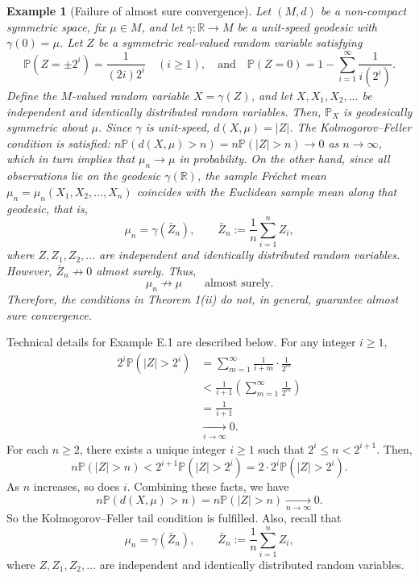 \documentclass[preprint]{imsart}
\theoremstyle{plain}
\newtheorem{example}{Example}
\theoremstyle{remark}
\begin{document}
\begin{appendix}
\begin{example}[Failure of almost sure convergence]
Let $(M, d)$ be a non-compact symmetric space, fix $\mu \in M$, and let $\gamma:\mathbb{R}\to M$ be a unit-speed geodesic with $\gamma(0)=\mu$. Let $Z$ be a symmetric real-valued random variable satisfying
$$
\mathbb{P}(Z = \pm 2^i) = \frac{1}{(2i)2^i} \quad (i \ge 1), \quad \mbox{and} \quad \mathbb{P}(Z=0) = 1 - \sum_{i=1}^\infty \frac{1}{i(2^i)}.
$$
Define the $M$-valued random variable $X= \gamma(Z)$, and let $X, X_1, X_2, \ldots$ be independent and identically distributed random variables. Then, $\mathbb{P}_X$ is geodesically symmetric about $\mu$. Since $\gamma$ is unit-speed, $d(X,\mu) = |Z|$. The Kolmogorov--Feller condition is satisfied:
$
n\mathbb{P}(d(X,\mu)>n) = n\mathbb{P}(|Z|>n) \to 0
$
as $n\to \infty$, which in turn implies that $\mu_n \to \mu$ in probability. On the other hand, since all observations lie on the geodesic $\gamma(\mathbb{R})$, the sample Fréchet mean $\mu_n=\mu_n(X_1, X_2, \ldots, X_n)$ coincides with the Euclidean sample mean along that geodesic, that is,
$$
\mu_n = \gamma(\bar Z_n),
\qquad
\bar Z_n := \frac{1}{n}\sum_{i=1}^n Z_i,
$$
where $Z, Z_1, Z_2, \ldots$ are independent and identically distributed random variables. However, $\bar Z_n \not\to 0$ almost surely. Thus,
$$
\mu_n \not\to \mu \qquad \text{almost surely}.
$$
Therefore, the conditions in Theorem 1(ii) do not, in general, guarantee almost sure convergence.
\end{example}
Technical details for Example E.1 are described below. For any integer $i\ge 1$,
\begin{align*}
2^i \mathbb{P}(|Z| > 2^i) &= \sum_{m=1}^{\infty} \frac{1}{i+m}\cdot\frac{1}{2^m} \\
&< \frac{1}{i+1} (\sum_{m=1}^{\infty} \frac{1}{2^m}) \\
&= \frac{1}{i+1} \\
&\underset{i \to \infty}{\to} 0.
\end{align*}
For each $n\ge 2$, there exists a unique integer $i\ge 1$ such that $2^i \le n <2^{i+1}$. Then,
$$
n\mathbb{P}(|Z| > n) <2^{i+1}\mathbb{P}(|Z|>2^i) = 2 \cdot 2^{i}\mathbb{P}(|Z|>2^i). 
$$
As $n$ increases, so does $i$. Combining these facts, we have
$$
n\mathbb{P}(d(X,\mu)>n) = n\mathbb{P}(|Z|>n) \underset{n\to \infty}{\to} 0.
$$
So the Kolmogorov--Feller tail condition is fulfilled. %
Also, recall that 
$$
\mu_n = \gamma(\bar Z_n),
\qquad
\bar Z_n := \frac{1}{n}\sum_{i=1}^n Z_i,
$$
where $Z, Z_1, Z_2, \ldots$ are independent and identically distributed random variables. 


\end{appendix}
\end{document}
